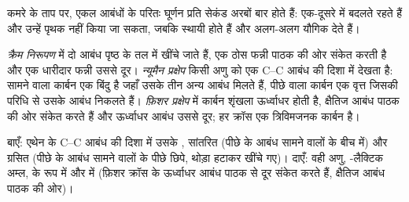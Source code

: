 कमरे के ताप पर, एकल आबंधों के परितः घूर्णन प्रति सेकंड अरबों बार होते हैं:
 एक-दूसरे में बदलते रहते हैं और उन्हें पृथक नहीं किया जा सकता, जबकि
 स्थायी होते हैं और अलग-अलग यौगिक देते हैं।

\begin{definition}[निरूपण]\label{def:b1:stereochemistry-in-depth:representations}
\emph{क्रैम निरूपण} में दो आबंध
पृष्ठ के तल में खींचे जाते हैं, एक ठोस फन्नी पाठक की ओर संकेत करती है
और एक धारीदार फन्नी उससे दूर। \emph{न्यूमैन प्रक्षेप}
किसी अणु को एक C--C आबंध की दिशा में देखता है: सामने वाला कार्बन एक
बिंदु है जहाँ उसके तीन अन्य आबंध मिलते हैं, पीछे वाला कार्बन एक वृत्त जिसकी
परिधि से उसके आबंध निकलते हैं। \emph{फ़िशर प्रक्षेप} में
कार्बन शृंखला ऊर्ध्वाधर होती है, क्षैतिज आबंध पाठक की ओर संकेत करते हैं
और ऊर्ध्वाधर आबंध उससे दूर; हर क्रॉस एक त्रिविमजनक कार्बन है।
\end{definition}

\begin{omfigure}

{\small बाएँ: एथेन के C--C आबंध की दिशा में उसके , सांतरित
(पीछे के आबंध सामने वालों के बीच में) और ग्रसित (पीछे के आबंध सामने वालों के
पीछे छिपे, थोड़ा हटाकर खींचे गए)। दाएँ: वही अणु,
-लैक्टिक अम्ल,  के रूप में और  में
(फ़िशर क्रॉस के ऊर्ध्वाधर आबंध पाठक से दूर संकेत करते हैं,
क्षैतिज आबंध पाठक की ओर)।}
\end{omfigure}

